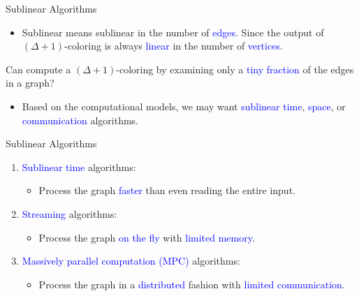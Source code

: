 \documentclass[aspectratio=169,xcolor=dvipsnames]{beamer}
\begin{document}
	\begin{frame}{Sublinear Algorithms}
		\begin{itemize}
			\item Sublinear means sublinear in the number of \textcolor{blue}{edges}. Since the output of \alert{$(\Delta + 1)$}-coloring is always \textcolor{blue}{linear} in the number of \textcolor{blue}{vertices}.
		\end{itemize}
		
		\begin{alertblock}{}
			Can compute a \alert{$(\Delta + 1)$}-coloring by examining only a \textcolor{blue}{tiny fraction} of the edges in a graph?
		\end{alertblock}
		\begin{itemize}
			\item Based on the computational models, we may want \textcolor{blue}{sublinear time}, \textcolor{blue}{space}, or \textcolor{blue}{communication} algorithms.
		\end{itemize}
		
	\end{frame}
	
	\begin{frame}{Sublinear Algorithms}
		
		\begin{enumerate}
			\item \textcolor{blue}{Sublinear time} algorithms:
			\begin{itemize}
				\item Process the graph \textcolor{blue}{faster} than even reading the entire input.
			\end{itemize}
			
			\vspace{2.5em}
			
			\item \textcolor{blue}{Streaming} algorithms:
			\begin{itemize}
				\item Process the graph \textcolor{blue}{on the fly} with \textcolor{blue}{limited memory}.
			\end{itemize}
			
			\vspace{2.5em}
			
			\item \textcolor{blue}{Massively parallel computation (MPC)} algorithms:
			\begin{itemize}
				\item Process the graph in a \textcolor{blue}{distributed} fashion with \textcolor{blue}{limited communication}.
			\end{itemize}
		\end{enumerate}
		
	\end{frame}
	
\end{document}
